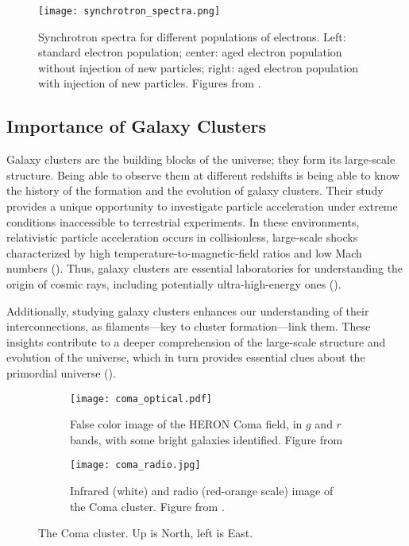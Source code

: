 \documentclass[11pt,letterpaper]{article}
\begin{document}
\begin{figure}[t]
	\centering
	\texttt{[image: synchrotron\_spectra.png]}
	\caption{Synchrotron spectra for different populations of electrons. Left: standard electron population; center: aged electron population without injection of new particles; right: aged electron population with injection of new particles. Figures from \cite{pizzo_tomography_2010}.}
	\label{fig:synchrotron_spectra}
\end{figure}


\subsection{Importance of Galaxy Clusters} \label{subsec:galaxy_clusters_why}
\par Galaxy clusters are the building blocks of the universe; they form its large-scale structure. Being able to observe them at different redshifts is being able to know the history of the formation and the evolution of galaxy clusters. Their study provides a unique opportunity to investigate particle acceleration under extreme conditions inaccessible to terrestrial experiments. In these environments, relativistic particle acceleration occurs in collisionless, large-scale shocks characterized by high temperature-to-magnetic-field ratios and low Mach numbers (\cite{van_weeren_diffuse_2019}). Thus, galaxy clusters are essential laboratories for understanding the origin of cosmic rays, including potentially ultra-high-energy ones (\cite{condorelli_impact_2023}).

\medskip
\par Additionally, studying galaxy clusters enhances our understanding of their interconnections, as filaments—key to cluster formation—link them. These insights contribute to a deeper comprehension of the large-scale structure and evolution of the universe, which in turn provides essential clues about the primordial universe (\cite{malavasi_cosmic_2023}).

\begin{figure}[t]
    \centering
    \begin{subfigure}[c]{0.40\textwidth}
        \centering
        \texttt{[image: coma\_optical.pdf]}
		\caption{False color image of the HERON Coma field, in $g$ and $r$ bands, with some bright galaxies identified. Figure from \cite{jimenez-teja_deep_2024}}
		\label{fig:coma_optical}
    \end{subfigure}
	\hspace{3pt}
    \begin{subfigure}[c]{0.40\textwidth}
        \centering
        \texttt{[image: coma\_radio.jpg]}
		\caption{Infrared (white) and radio (red-orange scale) image of the Coma cluster. Figure from \cite{bonafede_coma_2022-1}.}
		\label{fig:coma_radio}
    \end{subfigure}
       \caption{The Coma cluster. Up is North, left is East.}
       \label{fig:coma}
\end{figure}
\end{document}
